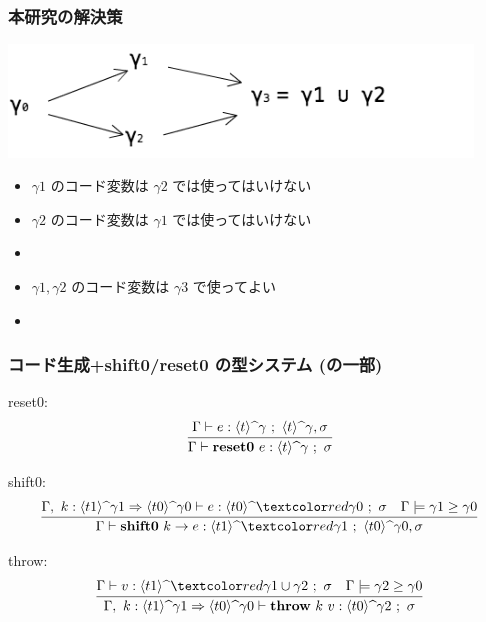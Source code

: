 \begin{frame}
  \frametitle{本研究の解決策}
  \flushleft
  \includegraphics[clip,height=3cm]{./img/ecgraph.png}
  \begin{itemize}
  \item<2-> $\gamma1$ のコード変数は $\gamma2$ では使ってはいけない
  \item<2-> $\gamma2$ のコード変数は $\gamma1$ では使ってはいけない
  \item<3->[$\Rightarrow$] 
  \end{itemize}

  \begin{itemize}
  \item<4-> $\gamma1, \gamma2$ のコード変数は $\gamma3$ で使ってよい
  \item<5->[$\Rightarrow$]  %
  \end{itemize}
\end{frame}

\begin{frame}[fragile]
  \frametitle{コード生成+shift0/reset0 の型システム\small{ (の一部)}}
  reset0:
  \[
    \infer{\Gamma \vdash \resetz{e} : \codeTs{t}{\gamma} ~;~ \sigma}
    {\Gamma \vdash e : \codeTs{t}{\gamma} ~;~ \codeTs{t}{\gamma}, \sigma}
  \]

  shift0:
  \[
    \infer{\Gamma \vdash \shiftz{k}{e} : \codeTs{t1}{\red{\gamma1}} ~;~ \codeTs{t0}{\gamma0},\sigma}
    {\Gamma,~k:\contT{\codeTs{t1}{\gamma1}}{\codeTs{t0}{\gamma0}}
      \vdash e : \codeTs{t0}{\red{\gamma0}} ~;~ \sigma
      & \Gamma \models \gamma1 \ord \gamma0
    }
  \]

  throw:
  \[
    \infer
    {\Gamma,~k:\contT{\codeTs{t1}{\gamma1}}{\codeTs{t0}{\gamma0}}
      \vdash \throw{k}{v} : \codeTs{t0}{\gamma2} ~;~ \sigma}
    {\Gamma
      \vdash v : \codeTs{t1}{\red{\gamma1 \cup \gamma2}} ~;~ \sigma
      & \Gamma \models \gamma2 \ord \gamma0
    }
  \]
\end{frame}


